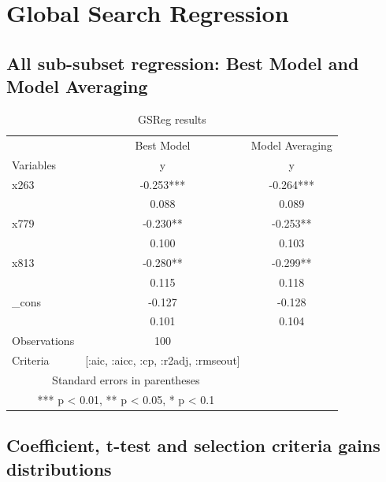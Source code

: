 \documentclass{article}
\begin{document}
\clearpage
\section{Global Search Regression}

\subsection{All sub-subset regression: Best Model and Model Averaging}

\begin{table}[!h]
  \centering
  \caption{GSReg results}
    
    \begin{tabular}{l c c}
    \hline
    \hline
                 &  Best Model               & Model Averaging            \\
    Variables    &  y               & y                 \\
    \hline 
    x263     & -0.253***  & -0.264***     \\
                 & 0.088        & 0.089  \\
     
    x779     & -0.230**  & -0.253**     \\
                 & 0.100        & 0.103  \\
     
    x813     & -0.280**  & -0.299**     \\
                 & 0.115        & 0.118  \\
     
    \_cons     & -0.127  & -0.128     \\
                 & 0.101        & 0.104  \\
    \hline

    Observations &   \multicolumn{ 1  }{c}{ 100 } \\
    Criteria     &   \multicolumn{ 1  }{c}{ [:aic, :aicc, :cp, :r2adj, :rmseout] } \\
    \hline
    \hline
    \multicolumn{ 2  }{c}{Standard errors in parentheses} \\
    \multicolumn{ 2  }{c}{*** p < 0.01, ** p < 0.05, * p < 0.1} \\
    \end{tabular}
  \label{tab:addlabel}
\end{table}

\subsection{Coefficient, t-test and selection criteria gains distributions}
\end{document}
